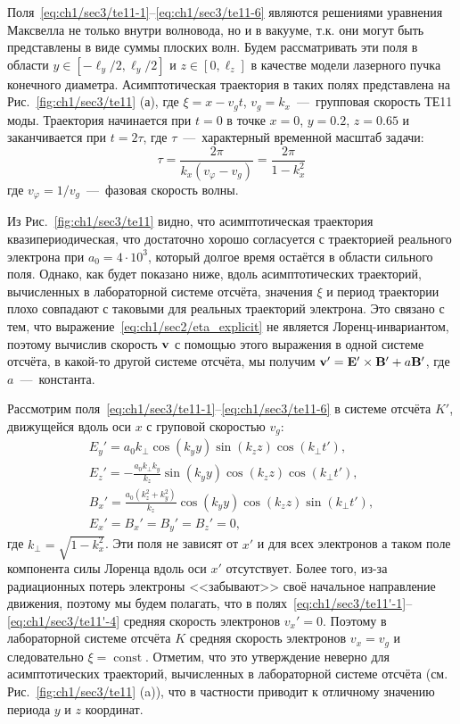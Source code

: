 Поля~\eqref{eq:ch1/sec3/te11-1}--\eqref{eq:ch1/sec3/te11-6} являются решениями уравнения Максвелла не только внутри волновода, но и в вакууме, т.к. они могут быть представлены в виде суммы плоских волн. Будем рассматривать эти поля в области ${y \in [-\ell_y / 2, \ell_y /2]}$ и $z \in [0, \ell_z]$ в качестве модели лазерного пучка конечного диаметра.
Асимптотическая траектория в таких полях представлена на Рис.~\ref{fig:ch1/sec3/te11} (а), где $\xi = x - v_g t$, $v_g=k_x$~---~групповая скорость ТЕ11 моды. Траектория начинается при $t = 0$ в точке $x = 0$, $y = 0.2$, $z = 0.65$ и заканчивается при $t = 2 \tau$, где $\tau$~---~характерный временной масштаб задачи:
\begin{equation}
    \label{tau}
    \tau = \frac{2 \pi}{k_x (v_\varphi - v_g)} = \frac{2 \pi}{1 - k_x^2}
\end{equation}
где $v_\varphi = 1 / v_g$~---~фазовая скорость волны. 

Из Рис.~\ref{fig:ch1/sec3/te11} видно, что асимптотическая траектория квазипериодическая, что достаточно хорошо согласуется с траекторией реального электрона при $a_0= 4 \cdot 10^3$, который долгое время остаётся в области сильного поля. Однако, как будет показано ниже, вдоль асимптотических траекторий, вычисленных в лабораторной системе отсчёта, значения $\xi$ и период траектории плохо совпадают с таковыми для реальных траекторий электрона. Это связано с тем, что выражение~\eqref{eq:ch1/sec2/eta_explicit} не является Лоренц-инвариантом, поэтому вычислив скорость $\vb v$ с помощью этого выражения в одной системе отсчёта, в какой-то другой системе отсчёта, мы получим ${\vb v}' = \vb{E}' \times \vb{B}' + a \vb{B}'$, где $a$~---~константа.

Рассмотрим поля~\eqref{eq:ch1/sec3/te11-1}--\eqref{eq:ch1/sec3/te11-6} в системе отсчёта $K'$, движущейся вдоль оси $x$ с груповой скоростью $v_g$:
\begin{eqnarray}
    \label{eq:ch1/sec3/te11'-1}
    E_y' = a_0 k_\perp \cos(k_y y) \sin(k_z z) \cos(k_\perp t'), \\
    \label{eq:ch1/sec3/te11'-2}
    E_z' = -\frac{a_0 k_\perp k_y}{k_z} \sin(k_y y) \cos(k_z z) \cos(k_\perp t'), \\
    \label{eq:ch1/sec3/te11'-3}
    B_x' = \frac{a_0 (k_z^2 + k_y^2)}{k_z} \cos(k_y y) \cos(k_z z) \sin(k_\perp t'), \\
    \label{eq:ch1/sec3/te11'-4}
    E_x' = B_x' = B_y' = B_z' = 0,
\end{eqnarray}
где $k_\perp = \sqrt{1 - k_x^2}$. Эти поля не зависят от $x'$ и для всех электронов а таком поле компонента силы Лоренца вдоль оси $x'$ отсутствует. Более того, из-за радиационных потерь электроны <<забывают>> своё начальное направление движения, поэтому мы будем полагать, что в полях~\eqref{eq:ch1/sec3/te11'-1}--\eqref{eq:ch1/sec3/te11'-4} средняя скорость электронов $v_x' = 0$. Поэтому в лабораторной системе отсчёта $K$ средняя скорость электронов $v_x = v_g$ и следовательно $\xi = \operatorname{const}$. Отметим, что это утверждение неверно для асимптотических траекторий, вычисленных в лабораторной системе отсчёта (см. Рис.~\ref{fig:ch1/sec3/te11} (a)), что в частности приводит к отличному значению периода $y$ и $z$ координат.

